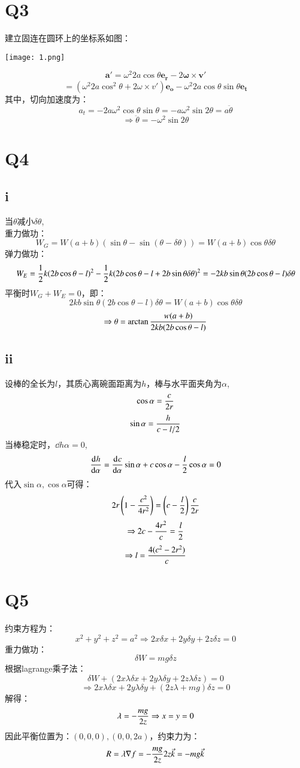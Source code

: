 \documentclass[UTF8,9pt]{ctexart}
\begin{document}
    \section{Q3}
        建立固连在圆环上的坐标系如图：
        \begin{center}
            \texttt{[image: 1.png]}\\ 
        \end{center}
        $$\bm{a'}=\omega^2 2a\cos\theta\bm{e_r}-2\bm{\omega} \times \bm{v}'$$
        $$=(\omega^2 2a\cos^2\theta+2\omega \times v')\bm{e_o}-\omega^2 2a\cos\theta\sin\theta\bm{e_t}$$
        其中，切向加速度为：
        $$a_t=-2a\omega^2 \cos\theta\sin\theta=-a\omega^2\sin2\theta=a\ddot{\theta}$$
        $$\Rightarrow \ddot{\theta}=-\omega^2\sin2\theta$$
    \section{Q4}
        \subsection{i}
            当$\theta$减小$\delta\theta$,\\
            重力做功：
            $$W_G=W(a+b)(\sin\theta-\sin(\theta-\delta\theta))=W(a+b)\cos\theta \delta\theta$$
            弹力做功：
            $$W_E=\frac{1}{2}k(2b\cos\theta-l)^2-\frac{1}{2}k(2b\cos\theta -l+ 2b\sin\theta \delta\theta)^2=-2kb \sin \theta (2b\cos\theta -l) \delta\theta$$
            平衡时$W_G+W_E=0$，即：
            $$2kb \sin \theta (2b\cos\theta -l) \delta\theta=W(a+b)\cos\theta \delta\theta$$
            $$ \Rightarrow \theta=\arctan\frac{w(a+b)}{2kb(2b\cos\theta-l)}$$
        \subsection{ii}
            设棒的全长为$l$，其质心离碗面距离为$h$，棒与水平面夹角为$\alpha$,
            $$\cos\alpha=\frac{c}{2r}$$
            $$\sin\alpha=\frac{h}{c-l/2}$$  
            当棒稳定时，$\dd{h}{\alpha}=0$,
            $$\frac{\mathrm{d}^{} h}{\mathrm{d} \alpha^{}}=\frac{\mathrm{d}^{} c}{\mathrm{d} \alpha^{}}\sin\alpha+c\cos\alpha-\frac{l}{2}\cos\alpha=0$$
            代入$\sin\alpha, \cos\alpha$可得：
            $$2r\left(1-\frac{c^2}{4r^2}\right)=\left(c-\frac{l}{2}\right)\frac{c}{2r}$$
            $$\Rightarrow 2c-\frac{4r^2}{c}=\frac{l}{2}$$
            $$\Rightarrow l=\frac{4(c^2-2r^2)}{c}$$
    \section{Q5}
        约束方程为：
        $$x^2+y^2+z^2=a^2 \Rightarrow 2x\delta x+2y\delta y + 2z\delta z=0$$
        重力做功：$$\delta W=mg\delta z$$
        根据lagrange乘子法：
        $$\delta W+ (2x\lambda\delta x+2y\lambda\delta y + 2z \lambda\delta z)=0$$
        $$\Rightarrow 2x\lambda\delta x+2y\lambda\delta y + (2z \lambda+mg)\delta z=0$$
        解得：
        $$
            \lambda=-\frac{mg}{2z} \Rightarrow x=y=0
        $$
        因此平衡位置为：$(0,0,0),(0,0,2a)$，约束力为：
        $$R=\lambda\nabla f=-\frac{mg}{2z} 2z\vec{k}=-mg\vec{k}$$
\end{document}
